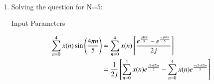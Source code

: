 \documentclass[journal,12pt,onecolumn]{IEEEtran}
\theoremstyle{remark}
\begin{document}
\solution\\
\begin{enumerate}
\item Solving the question for N=5:
\begin{table}[h!]
 	\centering
 	\resizebox{6 cm}{!}{
 		
 	}
 	\vspace{6 pt}
 	\caption{Input Parameters}
 	\label{tab:gate23ec47tab2}
 \end{table} 
\begin{align}
\sum\limits_{n=0}^{4}x(n) \sin\brak{\frac{4\pi n}{5}}&=\sum\limits_{n=0}^{4}x(n)\sbrak{\frac{e^{\frac{j4\pi n}{5}}-e^{\frac{-j4\pi n}{5}}}{2j}}\\
&=\frac{1}{2j}\sbrak{\sum\limits_{n=0}^{4}x(n)e^{\frac{j2\pi (2)n}{5}}-\sum\limits_{n=0}^{4}x(n)e^{\frac{-j2\pi (2)n}{5}}}\label{eq:gate23ec47eq2}
\end{align}


\end{enumerate}
\end{document}
